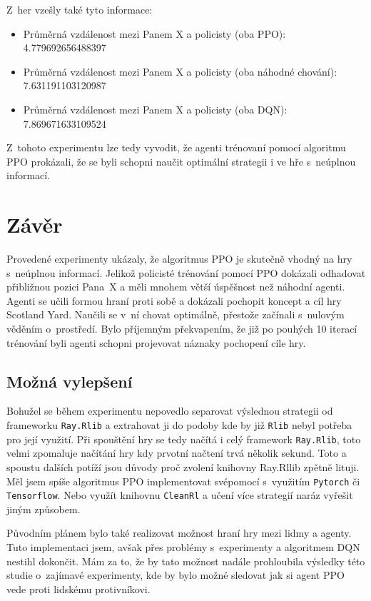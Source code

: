 Z~her vzešly také tyto informace:
\begin{itemize}
  \item Průměrná vzdálenost mezi Panem X a policisty (oba PPO): 4.779692656488397
  \item Průměrná vzdálenost mezi Panem X a policisty (oba náhodné chování): 7.631191103120987
  \item Průměrná vzdálenost mezi Panem X a policisty (oba DQN): 7.869671633109524
\end{itemize}

Z~tohoto experimentu lze tedy vyvodit, že agenti trénovaní pomocí algoritmu PPO prokázali, že se byli schopni naučit optimální strategii i ve hře s~neúplnou informací.

\chapter{Závěr}
\label{ch:zaver}

Provedené experimenty ukázaly, že algoritmus PPO je skutečně vhodný na hry s~neúplnou informací.
Jelikož policisté trénování pomocí PPO dokázali odhadovat přibližnou pozici Pana~X a měli mnohem větší úspěšnost než náhodní agenti.
Agenti se učili formou hraní proti sobě a dokázali pochopit koncept a cíl hry Scotland Yard.
Naučili se v~ní chovat optimálně, přestože začínali s~nulovým věděním o~prostředí.
Bylo příjemným překvapením, že již po pouhých 10 iterací trénování byli agenti schopni projevovat náznaky pochopení cíle hry.

\section*{Možná vylepšení}
\label{sec:mozna-vylepseni}

Bohužel se během experimentu nepovedlo separovat výslednou strategii od frameworku \texttt{Ray.Rlib} a extrahovat ji do podoby kde by již \texttt{Rlib} nebyl potřeba pro její využití.
Při spouštění hry se tedy načítá i celý framework \texttt{Ray.Rlib}, toto velmi zpomaluje načítání hry kdy prvotní načtení trvá několik sekund.
Toto a spoustu dalších potíží jsou důvody proč zvolení knihovny Ray.Rllib zpětně lituji.
Měl jsem spíše algoritmus PPO implementovat svépomocí s~využitím \texttt{Pytorch} či \texttt{Tensorflow}.
Nebo využít knihovnu \texttt{CleanRl} a učení více strategií naráz vyřešit jiným způsobem.

Původním plánem bylo také realizovat možnost hraní hry mezi lidmy a agenty.
Tuto implementaci jsem, avšak přes problémy s~experimenty a algoritmem DQN nestihl dokončit.
Mám za to, že by tato možnost nadále prohloubila výsledky této studie o~zajímavé experimenty, kde by bylo možné sledovat jak si agent PPO vede proti lidskému protivníkovi.

